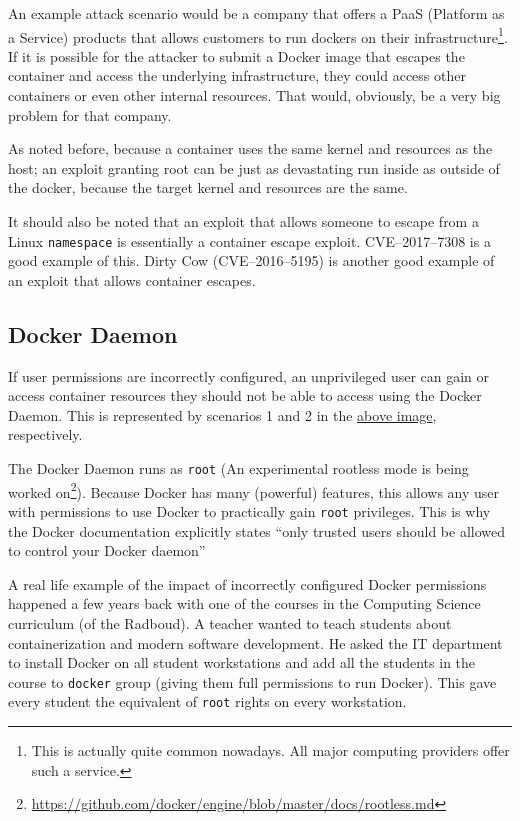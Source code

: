 \hfill

An example attack scenario would be a company that offers a PaaS (Platform as a Service) products that allows customers to run dockers on their infrastructure\footnote{This is actually quite common nowadays. All major computing providers offer such a service.}. If it is possible for the attacker to submit a Docker image that escapes the container and access the underlying infrastructure, they could access other containers or even other internal resources. That would, obviously, be a very big problem for that company.

\hfill

As noted before, because a container uses the same kernel and resources as the host; an exploit granting root can be just as devastating run inside as outside of the docker, because the target kernel and resources are the same.

It should also be noted that an exploit that allows someone to escape from a Linux \lstinline{namespace} is essentially a container escape exploit. CVE--2017--7308\cite{CVE-2017-7308} is a good example of this. Dirty Cow (CVE--2016--5195)\cite{CVE-2016-5195} is another good example of an exploit that allows container escapes\cite{Dirty-Cow-Escape}.

\subsection{Docker Daemon}
If user permissions are incorrectly configured, an unprivileged user can gain or access container resources they should not be able to access using the Docker Daemon. This is represented by scenarios 1 and 2 in the \href{fig:attacksurfaces}{above image}, respectively.

\hfill

The Docker Daemon runs as \lstinline{root} (An experimental rootless mode is being worked on\footnote{\url{https://github.com/docker/engine/blob/master/docs/rootless.md}}). Because Docker has many (powerful) features, this allows any user with permissions to use Docker to practically gain \lstinline{root} privileges. This is why the Docker documentation explicitly states ``only trusted users should be allowed to control your Docker daemon''\cite{Docker-Daemon-Attack-Surface}

\hfill

A real life example of the impact of incorrectly configured Docker permissions happened a few years back with one of the courses in the Computing Science curriculum (of the Radboud). A teacher wanted to teach students about containerization and modern software development. He asked the IT department to install Docker on all student workstations and add all the students in the course to \lstinline{docker} group (giving them full permissions to run Docker). This gave every student the equivalent of \lstinline{root} rights on every workstation.

